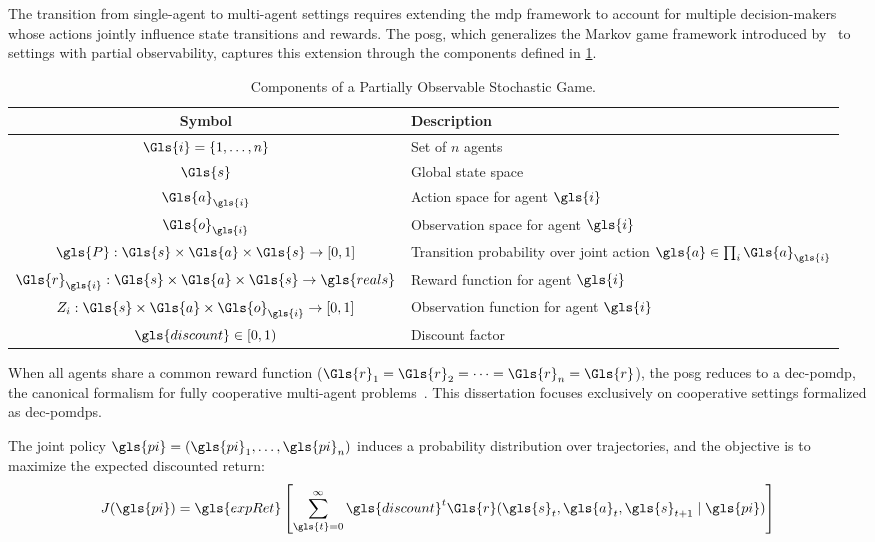 The transition from single-agent to multi-agent settings requires
extending the \gls{mdp} framework to account for multiple decision-makers
whose actions jointly influence state transitions and rewards.
The \gls{posg}, which generalizes the Markov game framework
introduced by~\cite{littman1994} to settings with partial observability,
captures this extension through the components defined in \cref{tab:posg-notation}.

\begin{table}[htbp]
\centering
\caption{Components of a Partially Observable Stochastic Game.}
\label{tab:posg-notation}
\begin{tabular}{@{}cl@{}}
\toprule
\textbf{Symbol} & \textbf{Description} \\
\midrule
\(\Gls{i} = \{1, \ldots, n\}\) & Set of $n$ agents \\
\(\Gls{s}\) & Global state space \\
\(\Gls{a}_{\gls{i}}\) & Action space for agent \(\gls{i}\) \\
\(\Gls{o}_{\gls{i}}\) & Observation space for agent \(\gls{i}\) \\
\(\gls{P}: \Gls{s} \times \Gls{a} \times \Gls{s} \rightarrow [0,1]\)
    & Transition probability over joint action \(\gls{a} \in \prod_{i} \Gls{a}_{\gls{i}}\) \\
\(\Gls{r}_{\gls{i}}: \Gls{s} \times \Gls{a} \times \Gls{s} \rightarrow \gls{reals}\)
    & Reward function for agent \(\gls{i}\) \\
\(Z_i: \Gls{s} \times \Gls{a} \times \Gls{o}_{\gls{i}} \rightarrow [0,1]\)
    & Observation function for agent \(\gls{i}\) \\
\(\gls{discount} \in [0,1)\) & Discount factor \\
\bottomrule
\end{tabular}
\end{table}

When all agents share a common reward function
(\(\Gls{r}_1 = \Gls{r}_2 = \cdots = \Gls{r}_n = \Gls{r}\)), the 
\gls{posg} reduces to a \gls{dec-pomdp}, the canonical formalism 
for fully cooperative multi-agent problems~\cite{busoniu2008}. 
This dissertation focuses exclusively on cooperative settings 
formalized as \glspl{dec-pomdp}.

The joint policy \(\gls{pi} = (\gls{pi}_1, \ldots, \gls{pi}_n)\) 
induces a probability distribution over trajectories, 
and the objective is to maximize the expected discounted return:
\begin{equation}
    J(\gls{pi}) 
    = \gls{expRet}\left[
        \sum_{\gls{t}=0}^{\infty} \gls{discount}^{t} 
        \Gls{r}(\gls{s}_{t}, \gls{a}_t, \gls{s}_{t+1} \mid \gls{pi})
    \right]
    \label{eq:joint-objective}
\end{equation}

